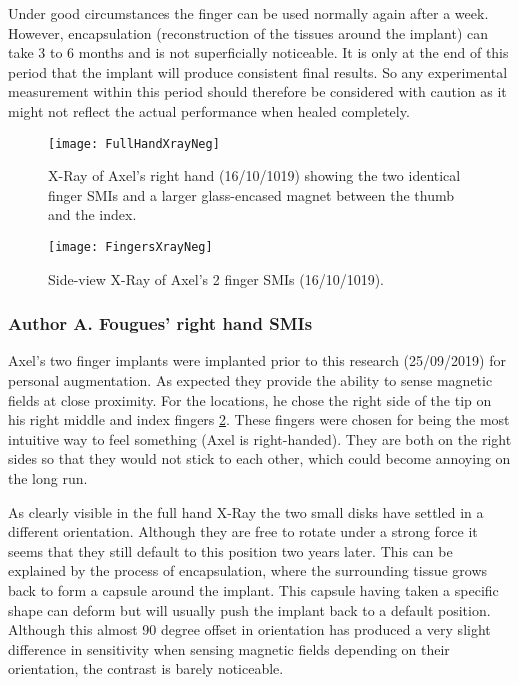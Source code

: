 \documentclass[10pt,journal,compsoc]{IEEEtran}
\begin{document}
			Under good circumstances the finger can be used normally again after a week. However, encapsulation (reconstruction of the tissues around the implant) can take 3 to 6 months and is not superficially noticeable. It is only at the end of this period that the implant will produce consistent final results. So any experimental measurement within this period should therefore be considered with caution as it might not reflect the actual performance when healed completely.
			
			\begin{figure}[!t]
				\centering
				\texttt{[image: FullHandXrayNeg]}
				\caption{X-Ray of Axel's right hand (16/10/1019) showing the two identical finger SMIs and a larger glass-encased magnet between the thumb and the index.}
				\label{FullHandXray}
			\end{figure}
			
			\begin{figure}[!t]
				\centering
				\texttt{[image: FingersXrayNeg]}
				\caption{Side-view X-Ray of Axel's 2 finger SMIs (16/10/1019).}
				\label{FingersXray}
			\end{figure}
			
		\subsubsection{Author A. Fougues' right hand SMIs}
		Axel's two finger implants  were implanted prior to this research (25/09/2019) for personal augmentation. As expected they provide the ability to sense magnetic fields at close proximity. For the locations, he chose the right side of the tip on his right middle and index fingers \ref{FingersXray}. These fingers were chosen for being the most intuitive way to feel something (Axel is right-handed). They are both on the right sides so that they would not stick to each other, which could become annoying on the long run.
		
		As clearly visible in the full hand X-Ray the two small disks have settled in a different orientation. Although they are free to rotate under a strong force it seems that they still default to this position two years later. This can be explained by the process of encapsulation, where the surrounding tissue grows back to form a capsule around the implant. This capsule having taken a specific shape can deform but will usually push the implant back to a default position.
		Although this almost 90 degree offset in orientation has produced a very slight difference in sensitivity when sensing magnetic fields depending on their orientation, the contrast is barely noticeable.
			
\end{document}
